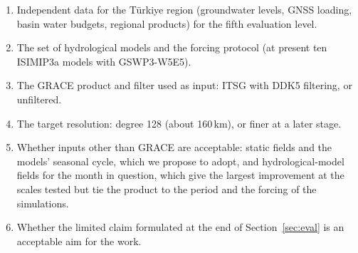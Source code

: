 \documentclass[11pt,a4paper]{article}
\begin{document}
\begin{enumerate}
  \item Independent data for the Türkiye region (groundwater levels, GNSS loading, basin
    water budgets, regional products) for the fifth evaluation level.
  \item The set of hydrological models and the forcing protocol (at present ten ISIMIP3a
    models with GSWP3-W5E5).
  \item The GRACE product and filter used as input: ITSG with DDK5 filtering, or unfiltered.
  \item The target resolution: degree 128 (about 160\,km), or finer at a later stage.
  \item Whether inputs other than GRACE are acceptable: static fields and the models' seasonal
    cycle, which we propose to adopt, and hydrological-model fields for the month in question,
    which give the largest improvement at the scales tested but tie the product to the period
    and the forcing of the simulations.
  \item Whether the limited claim formulated at the end of Section~\ref{sec:eval} is an
    acceptable aim for the work.
\end{enumerate}
\end{document}
